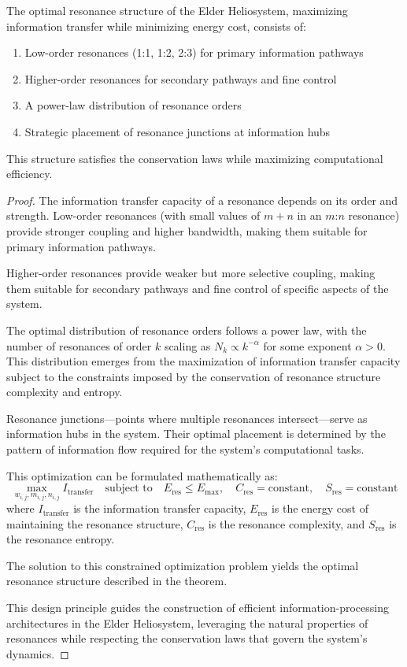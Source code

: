 \begin{theorem}
The optimal resonance structure of the Elder Heliosystem, maximizing information transfer while minimizing energy cost, consists of:
\begin{enumerate}
    \item Low-order resonances (1:1, 1:2, 2:3) for primary information pathways
    \item Higher-order resonances for secondary pathways and fine control
    \item A power-law distribution of resonance orders
    \item Strategic placement of resonance junctions at information hubs
\end{enumerate}
This structure satisfies the conservation laws while maximizing computational efficiency.
\end{theorem}

\begin{proof}
The information transfer capacity of a resonance depends on its order and strength. Low-order resonances (with small values of $m + n$ in an $m$:$n$ resonance) provide stronger coupling and higher bandwidth, making them suitable for primary information pathways.

Higher-order resonances provide weaker but more selective coupling, making them suitable for secondary pathways and fine control of specific aspects of the system.

The optimal distribution of resonance orders follows a power law, with the number of resonances of order $k$ scaling as $N_k \propto k^{-\alpha}$ for some exponent $\alpha > 0$. This distribution emerges from the maximization of information transfer capacity subject to the constraints imposed by the conservation of resonance structure complexity and entropy.

Resonance junctions—points where multiple resonances intersect—serve as information hubs in the system. Their optimal placement is determined by the pattern of information flow required for the system's computational tasks.

This optimization can be formulated mathematically as:
\begin{equation}
\max_{w_{i,j}, m_{i,j}, n_{i,j}} I_{\text{transfer}} \quad \text{subject to} \quad E_{\text{res}} \leq E_{\text{max}}, \quad C_{\text{res}} = \text{constant}, \quad S_{\text{res}} = \text{constant}
\end{equation}
where $I_{\text{transfer}}$ is the information transfer capacity, $E_{\text{res}}$ is the energy cost of maintaining the resonance structure, $C_{\text{res}}$ is the resonance complexity, and $S_{\text{res}}$ is the resonance entropy.

The solution to this constrained optimization problem yields the optimal resonance structure described in the theorem.

This design principle guides the construction of efficient information-processing architectures in the Elder Heliosystem, leveraging the natural properties of resonances while respecting the conservation laws that govern the system's dynamics.
\end{proof}

